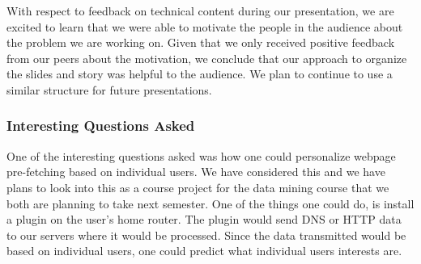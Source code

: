 \documentclass{article}
\begin{document}
With respect to feedback on technical content during our presentation, we are excited to learn that we were able to motivate the people in the audience about the problem we are working on.
Given that we only received positive feedback from our peers about the motivation, we conclude that our approach to organize the slides and story was helpful to the audience.
We plan to continue to use a similar structure for future presentations.

\subsubsection*{Interesting Questions Asked}

One of the interesting questions asked was how one could personalize webpage pre-fetching based on individual users.
We have considered this and we have plans to look into this as a course project for the data mining course that we both are planning to take next semester.
One of the things one could do, is install a plugin on the user's home router. 
The plugin would send DNS or HTTP data to our servers where it would be processed.
Since the data transmitted would be based on individual users, one could predict what individual users interests are.
\end{document}
